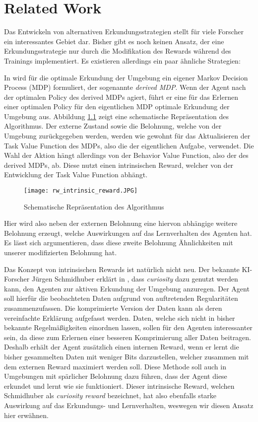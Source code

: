 \chapter{Related Work}

Das Entwickeln von alternativen Erkundungsstrategien stellt für viele Forscher ein interessantes Gebiet dar. Bisher gibt es noch keinen Ansatz, der eine Erkundungsstrategie nur durch die Modifikation des Rewards während des Trainings implementiert. Es existieren allerdings ein paar ähnliche Strategien:

In \cite{r09_csimcsek2006intrinsic} wird für die optimale Erkundung der Umgebung ein eigener Markov Decision Process (MDP) formuliert, der sogenannte \textit{derived MDP}. Wenn der Agent nach der optimalen Policy des derived MDPs agiert, führt er eine für das Erlernen einer optimalen Policy für den eigentlichen MDP optimale Erkundung der Umgebung aus. Abbildung \ref{img:rwIntrinsicReward} zeigt eine schematische Repräsentation des Algorithmus. Der externe Zustand sowie die Belohnung, welche von der Umgebung zurückgegeben werden, werden wie gewohnt für das Aktualisieren der Task Value Function des MDPs, also die der eigentlichen Aufgabe, verwendet. Die Wahl der Aktion hängt allerdings von der Behavior Value Function, also der des derived MDPs, ab. Diese nutzt einen intrinsischen Reward, welcher von der Entwicklung der Task Value Function abhängt.
\begin{figure}[h!]
    \centering
    \texttt{[image: rw\_intrinsic\_reward.JPG]}
    \caption{Schematische Repräsentation des Algorithmus} \label{img:rwIntrinsicReward}
\end{figure}
Hier wird also neben der externen Belohnung eine hiervon abhängige weitere Belohnung erzeugt, welche Auswirkungen auf das Lernverhalten des Agenten hat. Es lässt sich argumentieren, dass diese zweite Belohnung Ähnlichkeiten mit unserer modifizierten Belohnung hat.

Das Konzept von intrinsischen Rewards ist natürlich nicht neu. Der bekannte KI-Forscher Jürgen Schmidhuber erklärt in \cite{r01_schmidhuber2009driven}, dass \textit{curiosity} dazu genutzt werden kann, den Agenten zur aktiven Erkundung der Umgebung anzuregen. Der Agent soll hierfür die beobachteten Daten aufgrund von auftretenden Regularitäten zusammenzufassen. Die komprimierte Version der Daten kann als deren vereinfachte Erklärung aufgefasst werden. Daten, welche sich nicht in bisher bekannte Regelmäßigkeiten einordnen lassen, sollen für den Agenten interessanter sein, da diese zum Erlernen einer besseren Komprimierung aller Daten beitragen. Deshalb erhält der Agent zusätzlich einen internen Reward, wenn er lernt die bisher gesammelten Daten mit weniger Bits darzustellen, welcher zusammen mit dem externen Reward maximiert werden soll. Diese Methode soll auch in Umgebungen mit spärlicher Belohnung dazu führen, dass der Agent diese erkundet und lernt wie sie funktioniert. Dieser intrinsische Reward, welchen Schmidhuber als \textit{curiosity reward} bezeichnet, hat also ebenfalls starke Auswirkung auf das Erkundungs- und Lernverhalten, weswegen wir diesen Ansatz hier erwähnen.

